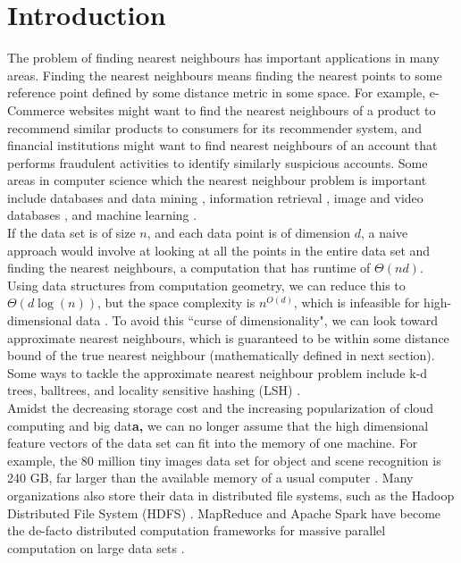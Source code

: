\documentclass[letterpaper,twocolumn,10pt]{article}
\theoremstyle{definition}
\begin{document}
\section{Introduction}

The problem of finding nearest neighbours has important applications in many areas. 
Finding the 
nearest neighbours means finding the nearest points to some reference point defined 
by some distance metric in some space. For example, e-Commerce websites might want 
to find the nearest neighbours of a product to recommend similar products to 
consumers for its recommender system, and financial institutions might want to find 
nearest neighbours of an account that performs fraudulent activities to identify 
similarly suspicious accounts. Some areas in computer science which the nearest 
neighbour problem is important include databases and data mining 
\cite{berkhin2006survey}, information retrieval \cite{croft2010search}, image and 
video databases \cite{faloutsos1994efficient,flickner1995query}, and machine 
learning \cite{weinberger2006distance}. \\

If the data set is of size $n$, and each data point is of dimension $d$, a naive 
approach would involve at looking at all the points in the entire data set and 
finding the nearest neighbours, a computation that has runtime of $\Theta(nd)$. 
Using data structures from computation geometry, we can reduce this to 
$\Theta(d\log(n))$, but the space complexity is $n^{O(d)}$, which is infeasible for 
high-dimensional data \cite{shalev2014understanding}. To avoid this ``curse of 
dimensionality", we can look toward approximate nearest neighbours, which is 
guaranteed to be within some distance bound of the true nearest neighbour 
(mathematically defined in next section). Some ways to tackle the approximate 
nearest neighbour problem include k-d trees, balltrees, and locality sensitive 
hashing (LSH) \cite{shakhnarovich2006nearest}. \\

Amidst the decreasing storage cost and the increasing popularization of cloud 
computing and big dat\textbf{a, }we can no longer assume that the high dimensional feature 
vectors of the data set can fit into the memory of one machine. For example, the 80 
million tiny images data set for object and scene recognition is 240 GB, far larger 
than the available memory of a usual computer \cite{torralba200880}. Many 
organizations also store their data in distributed file systems, such as the Hadoop 
Distributed File System (HDFS) \cite{shvachko2010hadoop}. MapReduce 
\cite{dean2008mapreduce} and Apache Spark \cite{zaharia2010spark} have become the 
de-facto distributed computation frameworks for massive parallel computation on 
large data sets \cite{suri2011counting}. \\
\end{document}
